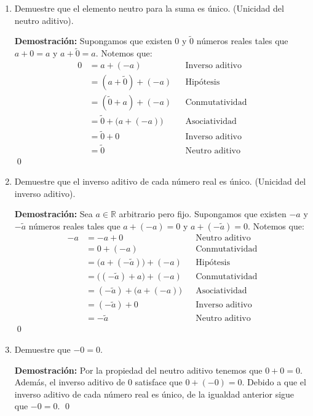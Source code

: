 \documentclass[11pt]{article}
\newcommand{\R}{\mathbb{R}}
\begin{document}
\begin{enumerate}[label=\alph*)]
    \item Demuestre que el elemento neutro para la suma es único. (Unicidad del neutro aditivo).
    
\textbf{Demostración:} 
Supongamos que existen 0 y $\tilde{0}$ números reales tales que $a+0 = a$ y $a+\tilde{0} = a$. Notemos que: \begin{align*}
    0 &=a+(-a) && \text{Inverso aditivo}\\
    &=\left( a+\tilde{0} \right)+\left(-a\right) && \text{Hipótesis}\\
    &=\left( \tilde{0}+a \right)+\left(-a\right) && \text{Conmutatividad}\\
    &=\tilde{0} + \bigl( a + \left(-a \right)\bigr) && \text{Asociatividad}\\
    &=\tilde{0} + 0 && \text{Inverso aditivo}\\
    &=\tilde{0} && \text{Neutro aditivo}
    \end{align*} \qed

    \item Demuestre que el inverso aditivo de cada número real es único. (Unicidad del inverso aditivo).
    
    \textbf{Demostración:}
    Sea $a\in \R$ arbitrario pero fijo. Supongamos que existen $-a$ y $-\tilde{a}$ números reales tales que $a + \left(-a\right) = 0$ y $a + \left(- \tilde{a}\right) = 0$. Notemos que:
    \begin{align*}
    -a &= -a+0 && \text{Neutro aditivo}\\
    &= 0+\left(-a\right) && \text{Conmutatividad}\\
    &= \bigl(a+\left(-\tilde{a} \right)\bigr)+\left(-a\right) && \text{Hipótesis}\\
    &= \bigl(\left(-\tilde{a} \right)+a\bigr)+\left(-a\right) && \text{Conmutatividad}\\
    &= \left(-\tilde{a} \right)+\bigl(a+\left(-a\right)\bigr) && \text{Asociatividad}\\
    &= \left(-\tilde{a} \right)+0 && \text{Inverso aditivo}\\
    &= -\tilde{a} && \text{Neutro aditivo}
    \end{align*} \qed

    \item Demuestre que $-0 = 0$.
    
    \textbf{Demostración:}
    Por la propiedad del neutro aditivo tenemos que $0+0=0$. Además, el inverso aditivo de $0$ satisface que $0 + (-0) = 0$. Debido a que el inverso aditivo de cada número real es único, de la igualdad anterior sigue que $-0 = 0$. \qed


\end{enumerate}
\end{document}
